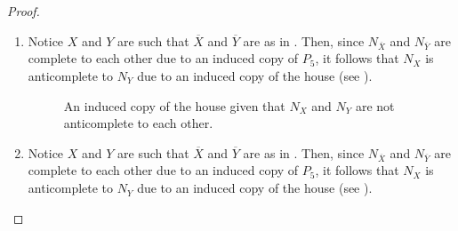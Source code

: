 \begin{proof}
    \leavevmode\par
    \begin{enumerate}[label=(\roman*)]
        \item Notice $X$ and $Y$ are such that $\overline{X}$ and $\overline{Y}$
            are as in . Then, since $N_{\overline{X}}$ and
            $N_{\overline{Y}}$ are complete to each other due to an induced copy
            of $P_5$, it follows that $N_X$ is anticomplete to $N_Y$ due to an
            induced copy of the house (see ).

            \begin{figure}[htb!]
                \centering
                \caption{An induced copy of the house given that $N_X$ and $N_Y$
                    are not anticomplete to each other.}
                \label{fig:anticomplete_1}
            \end{figure}
        
        \item Notice $X$ and $Y$ are such that $\overline{X}$ and $\overline{Y}$
            are as in . Then, since $N_{\overline{X}}$ and
            $N_{\overline{Y}}$ are complete to each other due to an induced copy
            of $P_5$, it follows that $N_X$ is anticomplete to $N_Y$ due to an
            induced copy of the house (see ).


\end{enumerate}
\end{proof}
